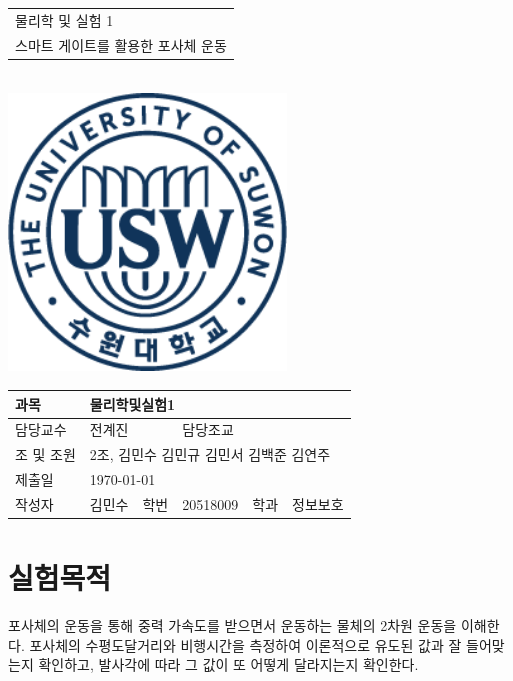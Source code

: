 \documentclass[12pt,a4paper]{article}
\begin{document}
\begin{titlepage}
    \centering
    \begin{tabular}{|C{15cm}|}
        \hline
        \rule{0in}{6ex}
        {\huge 물리학 및 실험 1\par} \\ 
        {\large 스마트 게이트를 활용한 포사체 운동\par} \\
        \hline
    \end{tabular} \\
    \vspace{5cm}
    \includegraphics[height=7.36cm]{logo.png}\par
    \vspace{3cm}
    \begin{tabular}{|l|l|l|l|l|l|}
        \hline
        과목 & \multicolumn{5}{l|}{물리학및실험1} \\
        \hline
        담당교수 & \multicolumn{2}{l|}{전계진} & 담당조교 & \multicolumn{2}{l|}{} \\
        \hline
        조 및 조원 & \multicolumn{5}{l|}{2조, 김민수 김민규 김민서 김백준 김연주} \\
        \hline
        제출일 & \multicolumn{5}{l|}{\today} \\
        \hline
        작성자 & 김민수 & 학번 & 20518009 & 학과 & 정보보호 \\
        \hline
    \end{tabular}
\end{titlepage}
\section{실험목적}
포사체의 운동을 통해 중력 가속도를 받으면서 운동하는 물체의 2차원 운동을 이해한다.
포사체의 수평도달거리와 비행시간을 측정하여 이론적으로 유도된 값과 잘 들어맞는지 확인하고,
발사각에 따라 그 값이 또 어떻게 달라지는지 확인한다.
\end{document}
